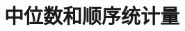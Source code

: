 \documentclass[a4paper,11pt]{ctexrep}
\begin{document}
\setcounter{chapter}{8}
\chapter{中位数和顺序统计量}
\end{document}
